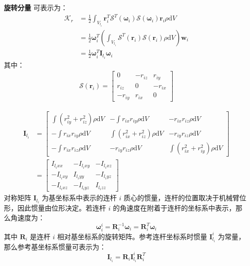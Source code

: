 \documentclass[cn,11pt,chinese,blue,bibstyle=ieeetr]{elegantbook}
\begin{document}
\textbf{旋转分量} 可表示为：
\begin{equation}\label{link_kinetic_energy_rotational_equation}
\begin{aligned}
\mathcal{K}_r &= \frac{1}{2} \int_{V_{l_i}} {\bm{r}_i^T {\bm{\mathcal{S}}^T \left(  \bm{\omega}_i \right)} {\bm{\mathcal{S}} \left(  \bm{\omega}_i \right)} \bm{r}_i \rho \mathrm{d}V}  \\
&= \frac{1}{2} \bm{\omega}_i^T \left( \int_{V_{l_i}} {{\bm{\mathcal{S}}^T \left( \bm{r}_i \right)} {\bm{\mathcal{S}} \left( \bm{r}_i \right)} \rho \mathrm{d}V} \right) \bm{w}_i \\
&= \frac{1}{2} \bm{\omega}_i^T \bm{I}_{l_i} \bm{\omega}_i
\end{aligned}
\end{equation}
其中：
\begin{equation}
\begin{aligned}
\bm{\mathcal{S}} \left( \bm{r}_i \right) = 
\begin{bmatrix}
0      & -r_{iz} & r_{iy} \\
r_{iz} & 0       & -r_{ix} \\
-r_{iy} & r_{ix}  & 0
\end{bmatrix}
\end{aligned}
\end{equation}

\begin{equation}
\begin{aligned}
\bm{I}_{l_i} &= 
\begin{bmatrix}
 \int {( r_{iy}^2 + r_{iz}^2) \rho \mathrm{d}V} & -\int {r_{ix} r_{iy} \rho \mathrm{d}V} & -{r_{ix} r_{iz} \rho \mathrm{d}V} \\
-\int {r_{ix} r_{iy} \rho \mathrm{d}V} &  \int {( r_{ix}^2 + r_{iz}^2) \rho \mathrm{d}V} & -{r_{iy} r_{iz} \rho \mathrm{d}V} \\
-\int {r_{ix} r_{iz} \rho \mathrm{d}V} & -{r_{iy} r_{iz} \rho \mathrm{d}V} &  \int {( r_{ix}^2 + r_{iy}^2) \rho \mathrm{d}V}
\end{bmatrix} \\
&= \begin{bmatrix}
 I_{{l_i}xx} & -I_{{l_i}xy} & -I_{{l_i}xz} \\
-I_{{l_i}xy} &  I_{{l_i}yy} & -I_{{l_i}yz} \\
-I_{{l_i}xz} & -I_{{l_i}yz} &  I_{{l_i}zz}
\end{bmatrix}
\end{aligned}
\end{equation}
对称矩阵 $\bm{I}_{l_i}$ 为基坐标系中表示的连杆 $i$ 质心的惯量，连杆的位置取决于机械臂位形，因此惯量由位形决定。若连杆 $i$ 的角速度在附着于连杆的坐标系中表示，那么角速度为：
$$ \bm{\omega}_i^i = \bm{R}_i^{-1} \bm{\omega}_i = \bm{R}_i^T \bm{\omega}_i $$
其中 $\bm{R}_i$ 是连杆 $i$ 相对基坐标系的旋转矩阵。参考连杆坐标系时惯量 $\bm{I}_{l_i}^i$ 为常量，那么参考基坐标系惯量可表示为：
\begin{equation}
\bm{I}_{l_i} = \bm{R}_i \bm{I}_{l_i}^i \bm{R}_i^{T}
\end{equation}
\end{document}
